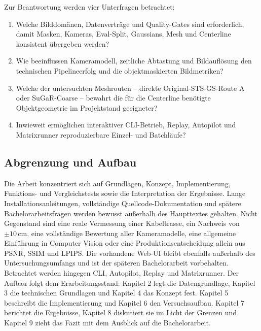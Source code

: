 Zur Beantwortung werden vier Unterfragen betrachtet:

\begin{enumerate}
  \item Welche Bilddomänen, Datenverträge und Quality-Gates sind erforderlich,
	  damit Masken, Kameras, Eval-Split, Gaussians, Mesh und Centerline
	  konsistent übergeben werden?
  \item Wie beeinflussen Kameramodell, zeitliche Abtastung und Bildauflösung
	  den technischen Pipelineerfolg und die objektmaskierten Bildmetriken?
  \item Welche der untersuchten Meshrouten -- direkte Original-STS-GS-Route A
	  oder SuGaR-Coarse -- bewahrt die für die Centerline benötigte
	  Objektgeometrie im Projektstand geeigneter?
  \item Inwieweit ermöglichen interaktiver CLI-Betrieb, Replay, Autopilot und
	  Matrixrunner reproduzierbare Einzel- und Batchläufe?
\end{enumerate}

\subsection{Abgrenzung und Aufbau}

Die Arbeit konzentriert sich auf Grundlagen, Konzept, Implementierung,
Funktions- und Vergleichstests sowie die Interpretation der Ergebnisse. Lange
Installationsanleitungen, vollständige Quellcode-Dokumentation und spätere
Bachelorarbeitsfragen werden bewusst außerhalb des Haupttextes gehalten. Nicht
Gegenstand sind eine reale Vermessung einer Kabeltrasse, ein Nachweis von
$\pm10\,\mathrm{cm}$, eine vollständige Bewertung aller Kameramodelle, eine
allgemeine Einführung in Computer Vision oder eine Produktionsentscheidung
allein aus PSNR, SSIM und LPIPS. Die vorhandene Web-UI bleibt ebenfalls
außerhalb des Untersuchungsumfangs und ist der späteren Bachelorarbeit
vorbehalten. Betrachtet werden hingegen CLI, Autopilot, Replay
und Matrixrunner. Der Aufbau folgt dem Erarbeitungsstand: Kapitel 2 legt die
Datengrundlage, Kapitel 3 die technischen Grundlagen und Kapitel 4 das
Konzept fest. Kapitel 5 beschreibt die Implementierung und Kapitel 6 den
Versuchsaufbau. Kapitel 7 berichtet die Ergebnisse, Kapitel 8 diskutiert sie
im Licht der Grenzen und Kapitel 9 zieht das Fazit mit dem Ausblick auf die
Bachelorarbeit.

